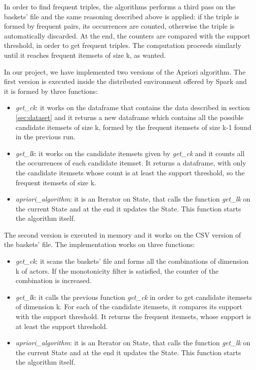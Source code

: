 \documentclass[conference,compsoc]{IEEEtran}
\theoremstyle{definition}
\begin{document}
In order to find frequent triples, the algorithms performs a third pass on the baskets' file and the same reasoning described above is applied: if the triple is formed by frequent pairs, its occurrences are counted, otherwise the triple is automatically discarded. At the end, the counters are compared with the support threshold, in order to get frequent triples. The computation proceeds similarly until it reaches frequent itemsets of size k, as wanted.

In our project, we have implemented two versions of the Apriori algorithm. The first version is executed inside the distributed environment offered by Spark and it is formed by three functions:  
\begin{itemize}
    \item \emph{get\_ck}: it works on the dataframe that contains the data described in section \ref{sec:dataset} and it returns a new dataframe which contains all the possible candidate itemsets of size k, formed by the frequent itemsets of size k-1 found in the previous run.
    \item \emph{get\_lk}: it works on the candidate itemsets given by \emph{get\_ck} and it counts all the occurrences of each candidate itemset. It returns a dataframe, with only the candidate itemsets whose count is at least the support threshold, so the frequent itemsets of size k.
    \item \emph{apriori\_algorithm}: it is an Iterator on State, that calls the function \emph{get\_lk} on the current State and at the end it updates the State. This function starts the algorithm itself.
\end{itemize}

The second version is executed in memory and it works on the CSV version of the baskets' file. The implementation works on three functions:
\begin{itemize}
    \item \emph{get\_ck}: it scans the baskets' file and forms all the combinations of dimension k of actors. If the monotonicity filter is satisfied, the counter of the combination is increased. 
    \item \emph{get\_lk}: it calls the previous function \emph{get\_ck} in order to get candidate itemsets of dimension k. For each of the candidate itemsets, it compares its support with the support threshold. It returns the frequent itemsets, whose support is at least the support threshold.
    \item \emph{apriori\_algorithm}: it is an Iterator on State, that calls the function \emph{get\_lk} on the current State and at the end it updates the State. This function starts the algorithm itself.
\end{itemize}
\end{document}
